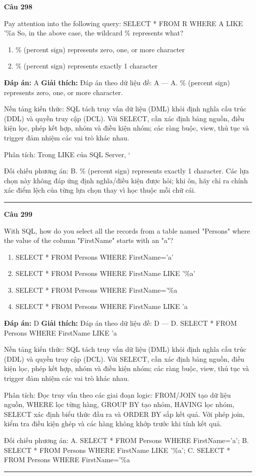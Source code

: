 \documentclass[11pt,a4paper]{article}
\newenvironment{question}[1]{%
  \par\vspace{1em}\noindent\textbf{\large Câu #1}\par\vspace{0.4em}
}{%
  \par\vspace{1em}\hrule\vspace{0.6em}
}
\newenvironment{choices}{%
  \begin{enumerate}[label=\textbf{\Alph*.},leftmargin=2.2em,itemsep=2pt,topsep=3pt]
}{%
  \end{enumerate}
}
\newcommand{\choice}{\item}
\begin{document}
\begin{question}{298}
Pay attention into the following query:
SELECT * FROM R
WHERE A LIKE '\%a%
So, in the above case, the wildcard \% represents what?
\begin{choices}
\choice \% (percent sign) represents zero, one, or more character
\choice \% (percent sign) represents exactly 1 character
\end{choices}
\textbf{Đáp án:} A
\textbf{Giải thích:} Đáp án theo dữ liệu đề: A — A. \% (percent sign) represents zero, one, or more character.

Nền tảng kiến thức: SQL tách truy vấn dữ liệu (DML) khỏi định nghĩa cấu trúc (DDL) và quyền truy cập (DCL). Với SELECT, cần xác định bảng nguồn, điều kiện lọc, phép kết hợp, nhóm và điều kiện nhóm; các ràng buộc, view, thủ tục và trigger đảm nhiệm các vai trò khác nhau.

Phân tích: Trong LIKE của SQL Server, `%

Đối chiếu phương án: B. \% (percent sign) represents exactly 1 character. Các lựa chọn này không đáp ứng định nghĩa/điều kiện được hỏi; khi ôn, hãy chỉ ra chính xác điểm lệch của từng lựa chọn thay vì học thuộc mỗi chữ cái.
\end{question}

\begin{question}{299}
With SQL, how do you select all the records from a table named "Persons" where the value of the column "FirstName" starts with an "a"?
\begin{choices}
\choice SELECT * FROM Persons WHERE FirstName='a'
\choice SELECT * FROM Persons WHERE FirstName LIKE '\%a'
\choice SELECT * FROM Persons WHERE FirstName='\%a%
\choice SELECT * FROM Persons WHERE FirstName LIKE 'a%
\end{choices}
\textbf{Đáp án:} D
\textbf{Giải thích:} Đáp án theo dữ liệu đề: D — D. SELECT * FROM Persons WHERE FirstName LIKE 'a%

Nền tảng kiến thức: SQL tách truy vấn dữ liệu (DML) khỏi định nghĩa cấu trúc (DDL) và quyền truy cập (DCL). Với SELECT, cần xác định bảng nguồn, điều kiện lọc, phép kết hợp, nhóm và điều kiện nhóm; các ràng buộc, view, thủ tục và trigger đảm nhiệm các vai trò khác nhau.

Phân tích: Đọc truy vấn theo các giai đoạn logic: FROM/JOIN tạo dữ liệu nguồn, WHERE lọc từng hàng, GROUP BY tạo nhóm, HAVING lọc nhóm, SELECT xác định biểu thức đầu ra và ORDER BY sắp kết quả. Với phép join, kiểm tra điều kiện ghép và các hàng không khớp trước khi tính kết quả.

Đối chiếu phương án: A. SELECT * FROM Persons WHERE FirstName='a'; B. SELECT * FROM Persons WHERE FirstName LIKE '\%a'; C. SELECT * FROM Persons WHERE FirstName='\%a%
\end{question}
\end{document}
